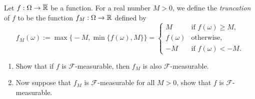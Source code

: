 \begin{problem}[Truncation]\label{pb:truncation}
	Let $f:\Omega\to\overline{\mathbb R}$ be a function. For a real number $M>0$, we define the \emph{truncation} of $f$ to be the function $f_M:\Omega\to \mathbb R$ defined by
	\[
		f_M(\omega) := \max\bigl\{ -M, \min\bigl\{ f(\omega),M\bigr\}\bigr\} = \begin{cases}
			M & \text{if $f(\omega)\ge M$,} \\
			f(\omega) & \text{otherwise}, \\
			-M & \text{if $f(\omega)< -M$.}
		\end{cases}
	\]
	\begin{enumerate}[label=(\alph*)]
		\item Show that if $f$ is $\mathcal{F}$-measurable, then $f_M$ is also $\mathcal{F}$-measurable.
		
		\item Now suppose that $f_M$ is $\mathcal{F}$-measurable for all $M>0$, show that $f$ is $\mathcal{F}$-measurable.
	\end{enumerate}
\end{problem}


